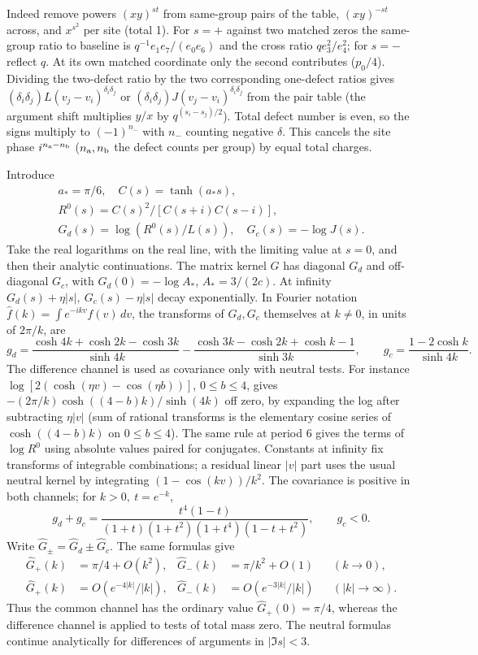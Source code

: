 Indeed remove powers $(xy)^{st}$ from same-group pairs of the table, $(xy)^{-st}$ across, and $x^{s^2}$ per site (total 1). For $s=+$ against two matched zeros the same-group ratio to baseline is $q^{-1}e_1e_7/(e_0e_6)$ and the cross ratio $q e_3^2/e_4^2$; for $s=-$ reflect $q$. At its own matched coordinate only the second contributes ($p_0/4$). Dividing the two-defect ratio by the two corresponding one-defect ratios gives $(\delta_i\delta_j)L(v_j-v_i)^{\delta_i\delta_j}$ or $(\delta_i\delta_j)J(v_j-v_i)^{\delta_i\delta_j}$ from the pair table (the argument shift multiplies $y/x$ by $q^{(s_i-s_j)/2}$). Total defect number is even, so the signs multiply to $(-1)^{n_-}$ with $n_-$ counting negative $\delta$. This cancels the site phase $i^{n_{\rm a}-n_{\rm b}}$ ($n_{\rm a},n_{\rm b}$ the defect counts per group) by equal total charges.

Introduce
\[
\begin{gathered}
a_*=\pi/6,\quad C(s)=\tanh(a_*s),\\
R^0(s)=C(s)^2/[C(s+i)C(s-i)],\\
G_d(s)=\log(R^0(s)/L(s)),\quad G_c(s)=-\log J(s).
\end{gathered}
\]
Take the real logarithms on the real line, with the limiting value at $s=0$, and then their analytic continuations. The matrix kernel $G$ has diagonal $G_d$ and off-diagonal $G_c$, with $G_d(0)=-\log A_*$, $A_*=3/(2c)$. At infinity $G_d(s)+\eta|s|,\ G_c(s)-\eta|s|$ decay exponentially. In Fourier notation $\widehat f(k)=\int e^{-ikv} f(v)\,dv$, the transforms of $G_d,G_c$ themselves at $k\ne0$, in units of $2\pi/k$, are
\[
g_d=\frac{\cosh4k+\cosh2k-\cosh3k}{\sinh4k}
 -\frac{\cosh3k-\cosh2k+\cosh k-1}{\sinh3k},\qquad g_c=\frac{1-2\cosh k}{\sinh4k}.
\]
The difference channel is used as covariance only with neutral tests. For instance $\log[2(\cosh(\eta v)-\cos(\eta b))]$, $0\le b\le4$, gives $-(2\pi/k)\cosh((4-b)k)/\sinh(4k)$ off zero, by expanding the log after subtracting $\eta|v|$ (sum of rational transforms is the elementary cosine series of $\cosh((4-b)k)$ on $0\le b\le4$). The same rule at period 6 gives the terms of $\log R^0$ using absolute values paired for conjugates. Constants at infinity fix transforms of integrable combinations; a residual linear $|v|$ part uses the usual neutral kernel by integrating $(1-\cos(kv))/k^2$. The covariance is positive in both channels; for $k>0,\ t=e^{-k}$,
\[
g_d+g_c=\frac{t^4(1-t)}{(1+t)(1+t^2)(1+t^4)(1-t+t^2)},\qquad g_c<0.
\]
Write $\widehat G_\pm=\widehat G_d\pm\widehat G_c$. The same formulas give
\begin{equation}\label{c7:gaussian-symbol-bounds}
\begin{aligned}
\widehat G_+(k)&=\pi/4+O(k^2),&
\widehat G_-(k)&=\pi/k^2+O(1) &&(k\longrightarrow0),\\
\widehat G_+(k)&=O(e^{-4|k|}/|k|),&
\widehat G_-(k)&=O(e^{-3|k|}/|k|) &&(|k|\longrightarrow\infty).
\end{aligned}
\end{equation}
Thus the common channel has the ordinary value $\widehat G_+(0)=\pi/4$, whereas the difference channel is applied to tests of total mass zero. The neutral formulas continue analytically for differences of arguments in $|\Im s|<3$.

